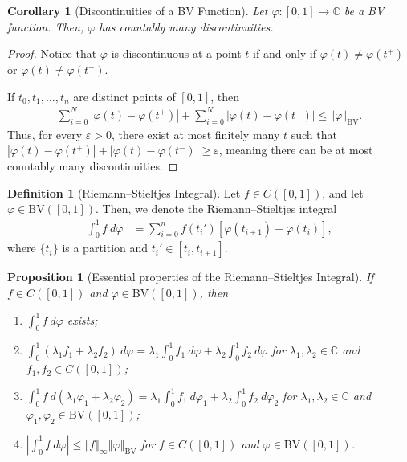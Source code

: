 \documentclass[10pt]{extarticle}
\newcommand{\C}{\mathbb{C}}
\newcommand{\norm}[1]{\left\Vert #1\right\Vert}
\newcommand{\ve}{\varepsilon}
\theoremstyle{plain}
\newtheorem*{corollary}{Corollary}
\newtheorem*{proposition}{Proposition}
\theoremstyle{definition}
\newtheorem*{definition}{Definition}
\theoremstyle{note}
\renewcommand{\newline}{\hfill\break}
\begin{document}
\begin{corollary}[Discontinuities of a BV Function]
  Let $\varphi: [0,1]\rightarrow \C$ be a BV function. Then, $\varphi$ has countably many discontinuities.
\end{corollary}
\begin{proof}
  Notice that $\varphi$ is discontinuous at a point $t$ if and only if $\varphi(t) \neq \varphi\left(t^{+}\right)$ or $\varphi(t) \neq \varphi\left(t^{-}\right)$.\newline

  If $t_0,t_1,\dots,t_n$ are distinct points of $[0,1]$, then
  \begin{align*}
    \sum_{i=0}^{N}\left\vert \varphi(t) - \varphi(t^{+}) \right\vert + \sum_{i=0}^{N}\left\vert \varphi(t) - \varphi(t^{-}) \right\vert \leq \norm{\varphi}_{\text{BV}}.
  \end{align*}
  Thus, for every $\ve > 0$, there exist at most finitely many $t$ such that $\left\vert \varphi(t) - \varphi\left(t^{+}\right) \right\vert + \left\vert \varphi(t) - \varphi(t^{-}) \right\vert \geq \ve$, meaning there can be at most countably many discontinuities.
\end{proof}
\begin{definition}[Riemann--Stieltjes Integral]
  Let $f\in C([0,1])$, and let $\varphi \in \text{BV}\left([0,1]\right)$. Then, we denote the Riemann--Stieltjes integral
  \begin{align*}
    \int_{0}^{1}f\:d\varphi &= \sum_{i=0}^{n}f\left(t_i'\right)\left[\varphi\left(t_{i+1}\right) - \varphi\left(t_i\right)\right],
  \end{align*}
  where $\{t_i\}$ is a partition and $t_i'\in [t_i,t_{i+1}]$.
\end{definition}
\begin{proposition}[Essential properties of the Riemann--Stieltjes Integral]
  If $f\in C([0,1])$ and $\varphi\in \text{BV}\left([0,1]\right)$, then
  \begin{enumerate}[(1)]
    \item $\displaystyle \int_{0}^{1} f\:d\varphi$ exists;
    \item $\displaystyle \int_{0}^{1} \left(\lambda_1f_1 + \lambda_2f_2\right)\:d\varphi = \lambda_1 \int_{0}^{1} f_1\:d\varphi + \lambda_2 \int_{0}^{1} f_2\:d\varphi$ for $\lambda_1,\lambda_2\in \C$ and $f_1,f_2 \in C([0,1])$;
    \item $\displaystyle \int_{0}^{1} f\:d\left(\lambda_1\varphi_1 + \lambda_2\varphi_2\right) = \lambda_1\int_{0}^{1} f_1\:d\varphi_1 + \lambda_2 \int_{0}^{1} f_2\:d\varphi_2$ for $\lambda_1,\lambda_2\in \C$ and $\varphi_1,\varphi_2\in \text{BV}\left([0,1]\right)$;
    \item $\displaystyle \left\vert \int_{0}^{1} f\:d\varphi \right\vert \leq \norm{f}_{\infty}\norm{\varphi}_{\text{BV}}$ for $f\in C\left([0,1]\right)$ and $\varphi \in \text{BV}\left([0,1]\right)$.
  \end{enumerate}
\end{proposition}
\end{document}
